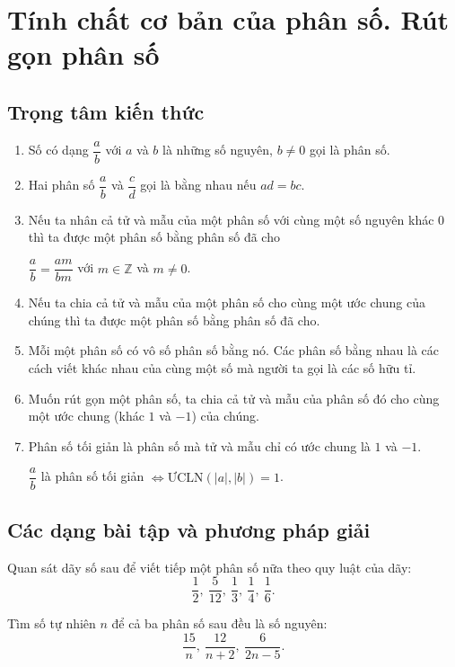 
\section{Tính chất cơ bản của phân số. Rút gọn phân số}
\subsection{Trọng tâm kiến thức}
\begin{enumerate}
	\item Số có dạng $\dfrac{a}{b}$ với $a$ và $b$ là những số nguyên, $b\ne 0$ gọi là phân số.
	\item Hai phân số $\dfrac{a}{b}$ và $\dfrac{c}{d}$ gọi là bằng nhau nếu $ad=bc$.
	\item Nếu ta nhân cả tử và mẫu của một phân số với cùng một số nguyên khác 0 thì ta được một phân số bằng phân số đã cho \\
	\centerline{$\dfrac{a}{b}=\dfrac{am}{bm}$ với $m\in\mathbb{Z}$ và $m\ne 0$.}
	\item Nếu ta chia cả tử và mẫu của một phân số cho cùng một ước chung của chúng thì ta được một phân số bằng phân số đã cho.
	\item Mỗi một phân số có vô số phân số bằng nó. Các phân số bằng nhau là các cách viết khác nhau của cùng một số mà người ta gọi là các số hữu tỉ.
	\item Muốn rút gọn một phân số, ta chia cả tử và mẫu của phân số đó cho cùng một ước chung (khác $1$ và $-1$) của chúng.
	\item Phân số tối giản là phân số mà tử và mẫu chỉ có ước chung là $1$ và $-1$.\\
	 \centerline{ $\dfrac{a}{b}$ là phân số tối giản $\Leftrightarrow \text{ƯCLN}(|a|,|b|)=1$. } 
\end{enumerate}
\subsection{Các dạng bài tập và phương pháp giải}

\begin{vd}
	Quan sát dãy số sau để viết tiếp một phân số nữa theo quy luật của dãy: $$\dfrac{1}{2},\ \dfrac{5}{12},\ \dfrac{1}{3},\ \dfrac{1}{4},\ \dfrac{1}{6}.$$
\end{vd}

\begin{vd}
	Tìm số tự nhiên $n$ để cả ba phân số sau đều là số nguyên: $$\dfrac{15}{n},\ \dfrac{12}{n+2},\ \dfrac{6}{2n-5}.$$
\end{vd}

